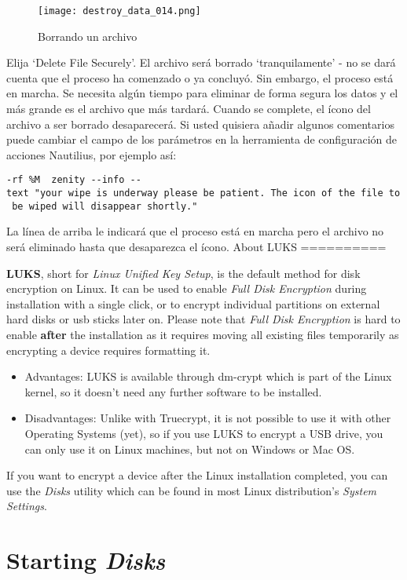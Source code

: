 \documentclass[10pt,a5paper,twoside,,]{book}
\begin{document}
\begin{figure}[htbp]
\centering
\texttt{[image: destroy\_data\_014.png]}
\caption{Borrando un archivo}
\end{figure}

Elija `Delete File Securely'. El archivo será borrado `tranquilamente' -
no se dará cuenta que el proceso ha comenzado o ya concluyó. Sin
embargo, el proceso está en marcha. Se necesita algún tiempo para
eliminar de forma segura los datos y el más grande es el archivo que más
tardará. Cuando se complete, el ícono del archivo a ser borrado
desaparecerá. Si usted quisiera añadir algunos comentarios puede cambiar
el campo de los parámetros en la herramienta de configuración de
acciones Nautilius, por ejemplo así:

\texttt{-rf\ \%M\ \textbar{}\ zenity\ -\/-info\ -\/-text\ "your\ wipe\ is\ underway\ please\ be\ patient.\ The\ icon\ of\ the\ file\ to\ be\ wiped\ will\ disappear\ shortly."}

La línea de arriba le indicará que el proceso está en marcha pero el
archivo no será eliminado hasta que desaparezca el ícono. About LUKS
==========

\textbf{LUKS}, short for \emph{Linux Unified Key Setup}, is the default
method for disk encryption on Linux. It can be used to enable \emph{Full
Disk Encryption} during installation with a single click, or to encrypt
individual partitions on external hard disks or usb sticks later on.
Please note that \emph{Full Disk Encryption} is hard to enable
\textbf{after} the installation as it requires moving all existing files
temporarily as encrypting a device requires formatting it.

\begin{itemize}
\item
  Advantages: LUKS is available through dm-crypt which is part of the
  Linux kernel, so it doesn't need any further software to be installed.
\item
  Disadvantages: Unlike with Truecrypt, it is not possible to use it
  with other Operating Systems (yet), so if you use LUKS to encrypt a
  USB drive, you can only use it on Linux machines, but not on Windows
  or Mac OS.
\end{itemize}

If you want to encrypt a device after the Linux installation completed,
you can use the \emph{Disks} utility which can be found in most Linux
distribution's \emph{System Settings}.

\section{\texorpdfstring{Starting
\emph{Disks}}{Starting Disks}}\label{starting-disks}
\end{document}
